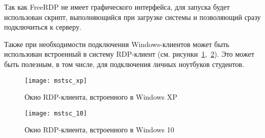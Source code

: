 Так как FreeRDP не имеет графического интерфейса, для запуска будет использован скрипт,
выполняющийся при загрузке системы и позволяющий сразу подключиться к серверу. 

Также при необходимости подключения Windows-клиентов может быть использован встроенный в
систему RDP-клиент (см. рисунки~\ref{pic:mstsc_xp},~\ref{pic:mstsc_10}). Это может быть
полезным, в том числе, для подключения личных ноутбуков студентов.

\begin{figure}[h]
    \center
    \texttt{[image: mstsc\_xp]}
    \caption{Окно RDP-клиента, встроенного в Windows XP}
    \label{pic:mstsc_xp}
\end{figure}

\begin{figure}[h]
    \center
    \texttt{[image: mstsc\_10]}
    \caption{Окно RDP-клиента, встроенного в Windows 10}
    \label{pic:mstsc_10}
\end{figure}
